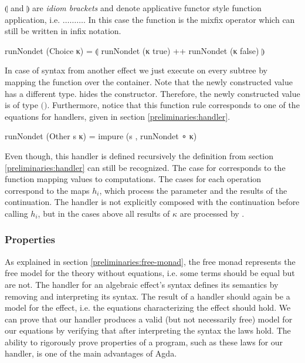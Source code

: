 \begin{AgdaAlign}
  $\llparenthesis$ and $\rrparenthesis$ are \textit{idiom brackets} and denote
  applicative functor style function application, i.e.
  \AgdaSpace{}\AgdaSpace{}\AgdaFunction{<*>}$\dots$\AgdaFunction{<*>}$\dots$\AgdaFunction{<*>}$\dots$.
  In this case the function  is the mixfix operator
  \AgdaFunction{++} which can still be written in infix notation.
  \begin{code}
runNondet (Choice κ)   = ⦇ runNondet (κ true) ++ runNondet (κ false) ⦈
  \end{code}
  In case of syntax from another effect we just execute 
  on every subtree by mapping the function over the container.
  Note that the newly constructed value has a different type.
   hides the 
  constructor.
  Therefore, the newly constructed  value is of
  type
  \AgdaSpace{}\AgdaSpace{}$($\AgdaSpace{}$)$.
  Furthermore, notice that this function rule corresponds to one of the equations
  for handlers, given in section \ref{preliminaries:handler}.
  \begin{code}
runNondet (Other s κ)  = impure (s , runNondet ∘ κ)
  \end{code}
  Even though, this handler is defined recursively the definition from section
  \ref{preliminaries:handler} can still be recognized.
  The case for  corresponds to the function
  mapping values to computations.
  The cases for each operation correspond to the maps $h_i$, which process the
  parameter and the results of the continuation.
  The handler is not explicitly composed with the continuation before calling
  $h_i$, but in the cases above all results of $\kappa$ are processed by
  .
\end{AgdaAlign}


\subsubsection{Properties}
\label{first-order:nondet:properties}

As explained in section \ref{preliminaries:free-monad}, the free monad
represents the free model for the theory without equations, i.e. some terms
should be equal but are not.
The handler for an algebraic effect's syntax defines its semantics by removing
and interpreting its syntax.
The result of a handler should again be a model for the effect, i.e. the
equations characterizing the effect should hold.
We can prove that our handler produces a valid (but not necessarily free) model
for our equations by verifying that after interpreting the syntax the laws hold.
The ability to rigorously prove properties of a program, such as these laws for
our handler, is one of the main advantages of Agda.

